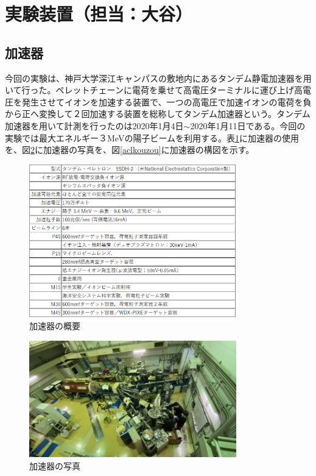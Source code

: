 \documentclass[a4paper,11pt,dvipdfmx]{jsarticle}
\begin{document}
\newpage
\section{\LARGE{実験装置（担当：大谷）}}

\subsection{加速器}
今回の実験は、神戸大学深江キャンパスの敷地内にあるタンデム静電加速器を用いて行った。ペレットチェーンに電荷を乗せて高電圧ターミナルに運び上げ高電圧を発生させてイオンを加速する装置で、一つの高電圧で加速イオンの電荷を負から正へ変換して２回加速する装置を総称してタンデム加速器という。\cite{tandemu}タンデム加速器を用いて計測を行ったのは2020年1月4日$\sim$2020年1月11日である。今回の実験では最大エネルギー３MeVの陽子ビームを利用する。表\ref{aclgaiyou}に加速器の使用を、図\ref{aclphoto}に加速器の写真を、図\ref{aclkouzou}に加速器の構図を示す。

\begin{figure}[H]
    \centering
    \includegraphics[width=90mm]{picture/setup/aclgaiyou.png}
    \caption{加速器の概要\cite{kasokukishiyou}}
    \label{aclgaiyou}
\end{figure}

\begin{figure}[H]
    \centering
    \includegraphics[width=90mm]{picture/setup/aclphoto.jpg}
    \caption{加速器の写真}
    \label{aclphoto}
\end{figure}
\end{document}

